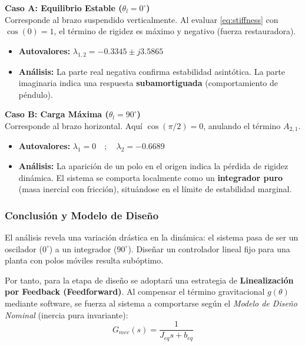\vspace{0.3cm}

\textbf{Caso A: Equilibrio Estable ($\theta_l = 0^\circ$)} \\
Corresponde al brazo suspendido verticalmente. Al evaluar \eqref{eq:stiffness} con $\cos(0)=1$, el término de rigidez es máximo y negativo (fuerza restauradora).
\begin{itemize}
    \item \textbf{Autovalores:} $\lambda_{1,2} = -0.3345 \pm j 3.5865$
    \item \textbf{Análisis:} La parte real negativa confirma estabilidad asintótica. La parte imaginaria indica una respuesta \textbf{subamortiguada} (comportamiento de péndulo).
\end{itemize}

\vspace{0.2cm}

\textbf{Caso B: Carga Máxima ($\theta_l = 90^\circ$)} \\
Corresponde al brazo horizontal. Aquí $\cos(\pi/2)=0$, anulando el término $A_{2,1}$.
\begin{itemize}
    \item \textbf{Autovalores:} $\lambda_{1} = 0 \quad ; \quad \lambda_{2} = -0.6689$
    \item \textbf{Análisis:} La aparición de un polo en el origen indica la pérdida de rigidez dinámica. El sistema se comporta localmente como un \textbf{integrador puro} (masa inercial con fricción), situándose en el límite de estabilidad marginal.
\end{itemize}

\subsubsection{Conclusión y Modelo de Diseño}
El análisis revela una variación drástica en la dinámica: el sistema pasa de ser un oscilador ($0^\circ$) a un integrador ($90^\circ$). Diseñar un controlador lineal fijo para una planta con polos móviles resulta subóptimo.

Por tanto, para la etapa de diseño se adoptará una estrategia de \textbf{Linealización por Feedback (Feedforward)}. Al compensar el término gravitacional $g(\theta)$ mediante software, se fuerza al sistema a comportarse según el \textit{Modelo de Diseño Nominal} (inercia pura invariante):
\begin{equation}
    G_{mec}(s) = \frac{1}{J_{eq}s + b_{eq}}
\end{equation}

